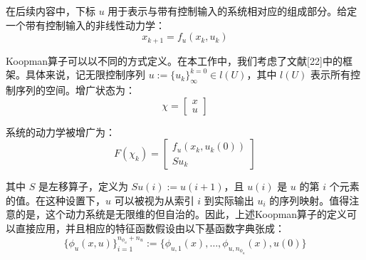 \documentclass[lang=chs, degree=master, blindreview=false, winfonts=true]{yanputhesis}
\begin{document}
在后续内容中，下标 \( u \) 用于表示与带有控制输入的系统相对应的组成部分。给定一个带有控制输入的非线性动力学：
\begin{equation}
	x_{k+1} = f_u(x_k, u_k)
\end{equation}

Koopman算子可以以不同的方式定义。在本工作中，我们考虑了文献[22]中的框架。具体来说，记无限控制序列 \( u := \{u_k\}_{\infty}^{k=0} \in l(U) \)，其中 \( l(U) \) 表示所有控制序列的空间。增广状态为：
\begin{equation}
	\chi=\begin{bmatrix}x\\u\end{bmatrix}
\end{equation}

系统的动力学被增广为：
\begin{equation}
	F(\chi_k)=\begin{bmatrix}f_u(x_k,u_k(0))\\Su_k\end{bmatrix}
\end{equation}

其中 \( S \) 是左移算子，定义为 \( Su(i) := u(i + 1) \)，且 \( u(i) \) 是 \( u \) 的第 \( i \) 个元素的值。在这种设置下，\( u \) 可以被视为从索引 \( i \) 到实际输出 \( u_i \) 的序列映射。值得注意的是，这个动力系统是无限维的但自治的。因此，上述Koopman算子的定义可以直接应用，并且相应的特征函数假设由以下基函数字典张成：
\begin{equation}
	\{\phi_u(x, u)\}_{i=1}^{n_{\phi_u} + n_u} := \{\phi_{u,1}(x), \ldots, \phi_{u,n_{\phi_u}}(x), u(0)\}
\end{equation}
\end{document}
